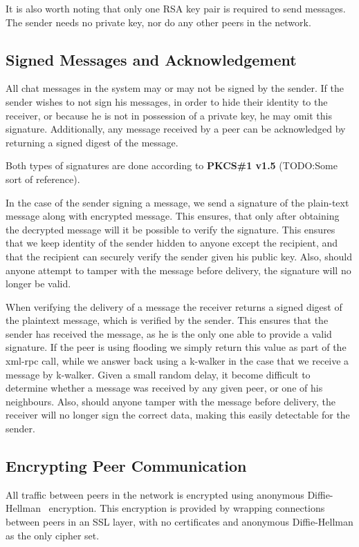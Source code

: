 It is also worth noting that only one RSA key pair is required to send messages. The sender needs no private key, nor do any other peers in the network.

\subsection{Signed Messages and Acknowledgement}

All chat messages in the system may or may not be signed by the sender. If the sender wishes to not sign his messages, in order to hide their identity to the receiver, or because he is not in possession of a private key, he may omit this signature. Additionally, any message received by a peer can be acknowledged by returning a signed digest of the message.

Both types of signatures are done according to \textbf{PKCS\#1 v1.5} (TODO:Some sort of reference).

In the case of the sender signing a message, we send a signature of the plain-text message along with encrypted message. This ensures, that only after obtaining the decrypted message will it be possible to verify the signature. This ensures that we keep identity of the sender hidden to anyone except the recipient, and that the recipient can securely verify the sender given his public key. Also, should anyone attempt to tamper with the message before delivery, the signature will no longer be valid.

When verifying the delivery of a message the receiver returns a signed digest of the plaintext message, which is verified by the sender. This ensures that the sender has received the message, as he is the only one able to provide a valid signature. If the peer is using flooding we simply return this value as part of the xml-rpc call, while we answer back using a k-walker in the case that we receive a message by k-walker. Given a small random delay, it become difficult to determine whether a message was received by any given peer, or one of his neighbours. Also, should anyone tamper with the message before delivery, the receiver will no longer sign the correct data, making this easily detectable for the sender.

\subsection{Encrypting Peer Communication}

All traffic between peers in the network is encrypted using anonymous Diffie-Hellman~\citep{DH} encryption. This encryption is provided by wrapping connections between peers in an SSL layer, with no certificates and anonymous Diffie-Hellman as the only cipher set.


